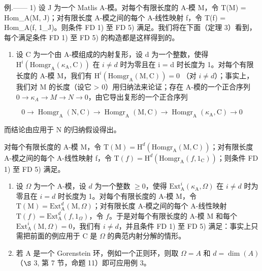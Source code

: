 例.—— 1) 设 J 为一个 Matlis A-模。对每个有限长度的 A-模 M，令 T(M) = Hom\_A(M, J)；对有限长度 A-模之间的每个 A-线性映射 f，令 T(f) = Hom\_A(f, 1\_J)。则条件 FD 1) 至 FD 5) 满足。我们将在下面（定理 3）看到，每个满足条件 FD 1) 至 FD 5) 的构造都是这样得到的。

\begin{enumerate}
\def\labelenumi{\arabic{enumi})}
\setcounter{enumi}{1}
\tightlist
\item
  设 C 为一个由 A-模组成的内射复形，设 d 为一个整数，使得 \(\mathrm{H}^{i}(\mathrm{Homgr}_{\mathrm{A}}(\kappa_{\mathrm{A}},\mathrm{C}))\) 在 \(i \neq d\) 时为零且在 i = d 时长度为 1。对每个有限长度的 A-模 M，我们有 \(\mathrm{H}^{i}(\mathrm{Homgr}_{\mathrm{A}}(\mathrm{M},\mathrm{C})) = 0\) （对 \(i \neq d\)）；事实上，我们对 M 的长度（设它 \textgreater{} 0）用归纳法来论证；存在 A-模的一个正合序列 \(0 \to \kappa_{A} \to M \to N \to 0\)，由它导出复形的一个正合序列
\end{enumerate}

\[
0 \rightarrow \operatorname{Homgr} _ {\mathrm{A}} (\mathrm{N}, \mathrm{C}) \longrightarrow \operatorname{Homgr} _ {\mathrm{A}} (\mathrm{M}, \mathrm{C}) \longrightarrow \operatorname{Homgr} _ {\mathrm{A}} (\kappa_ {\mathrm{A}}, \mathrm{C}) \longrightarrow 0
\]

而结论由应用于 N 的归纳假设得出。

对每个有限长度的 A-模 M，令 \(\mathrm{T}(\mathrm{M})=\mathrm{H}^{d}(\mathrm{Homgr}_{\mathrm{A}}(\mathrm{M},\mathrm{C}))\)；对有限长度 A-模之间的每个 A-线性映射 f，令 \(\mathrm{T}(f)=\mathrm{H}^{d}(\mathrm{Homgr}_{\mathrm{A}}(f,1_{\mathrm{C}}))\)；则条件 FD 1) 至 FD 5) 满足。

\begin{enumerate}
\def\labelenumi{\arabic{enumi})}
\setcounter{enumi}{2}
\item
  设 \(\Omega\) 为一个 A-模，设 \(d\) 为一个整数 \(\geqslant 0\)，使得 \(\mathrm{Ext}_{\mathrm{A}}^{i}(\kappa_{\mathrm{A}},\Omega)\) 在 \(i\neq d\) 时为零且在 \(i = d\) 时长度为 1。对每个有限长度的 A-模 M，令 \(\mathrm{T(M)} = \mathrm{Ext}_{\mathrm{A}}^{d}(\mathrm{M},\Omega)\)；对有限长度 A-模之间的每个 A-线性映射 \(\mathrm{T}(f) = \mathrm{Ext}_{\mathrm{A}}^{d}(f,1_{\Omega})\)，令 \(f\)。于是对每个有限长度的 A-模 M 和每个 \(\mathrm{Ext}_{\mathrm{A}}^{i}(\mathrm{M},\Omega) = 0\)，我们有 \(i\neq d\)，并且条件 FD 1) 至 FD 5) 满足：事实上只需把前面的例应用于 C 是 \(\Omega\) 的典范内射分解的情形。
\item
  若 A 是一个 Gorenstein 环，例如一个正则环，则取 \(\Omega = A\) 和 \(d = \dim(A)\)（\(\S\) 3, 第 7 节，命题 11）即可应用例 3。
\end{enumerate}


